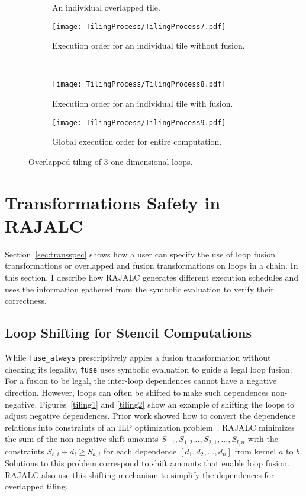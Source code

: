 \begin{figure*}
\begin{subfigure}[t]{0.5\textwidth}
		\caption{An individual overlapped tile.}
	\end{subfigure}
	\par\bigskip
	\begin{subfigure}[t]{0.5\textwidth}
		\centering
		\texttt{[image: TilingProcess/TilingProcess7.pdf]}
		\caption{Execution order for an individual tile without fusion.}
		\label{tileNofuse}
	\end{subfigure}
	~
	\begin{subfigure}[t]{0.5\textwidth}
		\centering
		\texttt{[image: TilingProcess/TilingProcess8.pdf]}
		\caption{Execution order for an individual tile with fusion.}
		\label{tileFuse}
	\end{subfigure}
	\par\bigskip
	\begin{subfigure}[t]{\textwidth}
		\centering
		\texttt{[image: TilingProcess/TilingProcess9.pdf]}
		\caption{Global execution order for entire computation.}
		\label{tiling9}
	\end{subfigure}
\label{tilingProcess}
\caption{Overlapped tiling of 3 one-dimensional loops.}
\end{figure*}

\section{Transformations Safety in RAJALC}
Section~\ref{sec:transspec} shows how a user can specify the use of loop fusion transformations
or overlapped and fusion transformations on loops in a chain.
In this section, I describe 
how RAJALC generates different execution schedules and uses the information gathered from the symbolic evaluation to verify their correctness.

\subsection{Loop Shifting for Stencil Computations}

While \verb.fuse_always. prescriptively apples a fusion transformation
without checking its legality, \verb.fuse. uses symbolic evaluation to
guide a legal loop fusion.
For a fusion to be legal, the inter-loop dependences cannot have a
negative direction.
However, loops can often be shifted to make such
dependences non-negative.
Figures~\ref{tiling1} and \ref{tiling2} show an example of shifting the
loops to adjust negative dependences.
Prior work showed how to convert the dependence relations into constraints
of an ILP optimization problem~\cite{Bertolacci2019}.
RAJALC minimizes the sum of the non-negative shift amounts
$S_{1,1},S_{1,2}...,S_{2,1},...,S_{l,n}$ with the constraints $S_{b,i} + d_i \geq S_{a,i}$ for each dependence
$[d_1,d_2,...,d_n]$ from kernel $a$ to $b$.
Solutions to this problem correspond to shift amounts that enable loop fusion.
RAJALC also use this shifting mechanism to simplify the dependences for overlapped
tiling.

